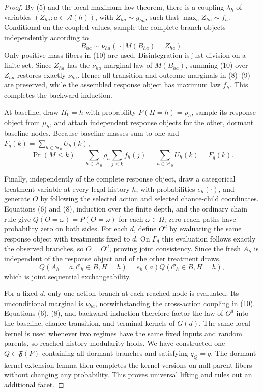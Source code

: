 \documentclass{article}
\begin{document}
\begin{proof}
By (5) and the local maximum-law theorem, there is a coupling \(\lambda_h\) of variables \((Z_{ha}:a\in\mathcal A(h))\), with \(Z_{ha}\sim g_{ha}\), such that \(\max_aZ_{ha}\sim f_h\).  Conditional on the coupled values, sample the complete branch objects independently according to
\[
 B_{ha}\sim\nu_{ha}(\,\cdot\mid M(B_{ha})=Z_{ha}).        \tag{10}
\]
Only positive-mass fibers in (10) are used.  Disintegration is just division on a finite set.  Since \(Z_{ha}\) has the \(\nu_{ha}\)-marginal law of \(M(B_{ha})\), summing (10) over \(Z_{ha}\) restores exactly \(\nu_{ha}\).  Hence all transition and outcome marginals in (8)--(9) are preserved, while the assembled response object has maximum law \(f_h\).  This completes the backward induction.

At baseline, draw \(H_0=h\) with probability \(P(H=h)=\rho_h\), sample its response object from \(\mu_h\), and attach independent response objects for the other, dormant baseline nodes.  Because baseline masses sum to one and \(F_q(k)=\sum_{h\in\mathcal H_0}U_h(k)\),
\[
 \Pr(M\leq k)=\sum_{h\in\mathcal H_0}\rho_h
       \sum_{j\leq k}f_h(j)
 =\sum_{h\in\mathcal H_0}U_h(k)=F_q(k).                  \tag{11}
\]

Finally, independently of the complete response object, draw a categorical treatment variable at every legal history \(h\), with probabilities \(e_h(\cdot)\), and generate \(O\) by following the selected action and selected chance-child coordinates.  Equations (6) and (8), induction over the finite depth, and the ordinary chain rule give \(Q(O=\omega)=P(O=\omega)\) for each \(\omega\in\Omega\); zero-reach paths have probability zero on both sides.  For each \(d\), define \(O^d\) by evaluating the same response object with treatments fixed to \(d\).  On \(\Gamma_d\) this evaluation follows exactly the observed branches, so \(O=O^d\), proving joint consistency.  Since the fresh \(A_h\) is independent of the response object and of the other treatment draws,
\[
 Q(A_h=a,\mathcal C_h\in B,H=h)
 =e_h(a)Q(\mathcal C_h\in B,H=h),                         \tag{12}
\]
which is joint sequential exchangeability.

For a fixed \(d\), only one action branch at each reached node is evaluated.  Its unconditional marginal is \(\nu_{ha}\), notwithstanding the cross-action coupling in (10).  Equations (6), (8), and backward induction therefore factor the law of \(O^d\) into the baseline, chance-transition, and terminal kernels of \(G(d)\).  The same local kernel is used whenever two regimes have the same fixed inputs and random parents, so reached-history modularity holds.  We have constructed one \(Q\in\mathfrak F(P)\) containing all dormant branches and satisfying \(q_Q=q\).  The dormant-kernel extension lemma then completes the kernel versions on null parent fibers without changing any probability.  This proves universal lifting and rules out an additional facet.
\end{proof}
\end{document}

